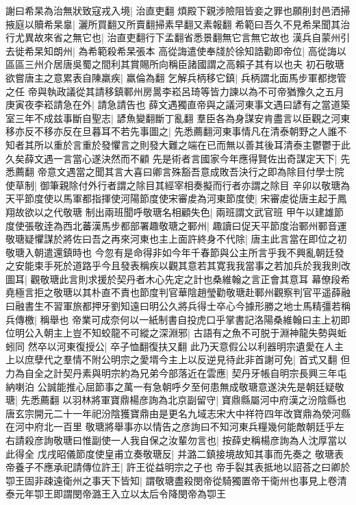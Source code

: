 謝曰希杲為治無狀致寇戎入境|{
	治直吏翻}
煩殿下親涉險阻皆妾之罪也願削封邑洒掃掖庭以贖希杲辠|{
	灑所買翻又所賣翻掃素早翻又素報翻}
希範曰吾久不見希杲聞其治行尤異故來省之無它也|{
	治直吏翻行下孟翻省悉景翻無它言無它故也}
漢兵自蒙州引去徙希杲知朗州|{
	為希範殺希杲張本}
高從誨遣使奉牋於徐知誥勸即帝位|{
	高從誨以區區三州介居唐吳蜀之間利其賞賜所向稱臣諸國謂之高賴子其有以也夫}
初石敬瑭欲嘗唐主之意累表自陳羸疾|{
	羸倫為翻}
乞解兵柄移它鎮|{
	兵柄謂北面馬步軍都揔管之任}
帝與執政議從其請移鎮鄆州房暠李崧呂琦等皆力諫以為不可帝猶豫久之五月庚寅夜李崧請急在外|{
	請急請告也}
薛文遇獨直帝與之議河東事文遇曰諺有之當道築室三年不成兹事斷自聖志|{
	諺魚變翻斷丁亂翻}
羣臣各為身謀安肯盡言以臣觀之河東移亦反不移亦反在旦暮耳不若先事圖之|{
	先悉薦翻河東事情凡在清泰朝野之人誰不知者其所以重於言重於發懼言之則發大難之端在已而無以善其後耳清泰主鬱鬱于此久矣薛文遇一言當心遂決然而不顧}
先是術者言國家今年應得賢佐出奇謀定天下|{
	先悉薦翻}
帝意文遇當之聞其言大喜曰卿言殊豁吾意成敗吾決行之即為除目付學士院使草制|{
	御筆親除付外行者謂之除目其經宰相奏擬而行者亦謂之除目}
辛卯以敬瑭為天平節度使以馬軍都指揮使河陽節度使宋審䖍為河東節度使|{
	宋審䖍從唐主起于鳳翔故欲以之代敬瑭}
制出兩班聞呼敬瑭名相顧失色|{
	兩班謂文武官班}
甲午以建雄節度使張敬逹為西北蕃漢馬步都部署趣敬瑭之鄆州|{
	趣讀曰促天平節度治鄆州鄆音運}
敬瑭疑懼謀於將佐曰吾之再來河東也主上面許終身不代除|{
	唐主此言當在即位之初敬瑭入朝遣還鎮時也}
今忽有是命得非如今年千春節與公主所言乎我不興亂朝廷發之安能束手死於道路乎今且發表稱疾以觀其意若其寛我我當事之若加兵於我我則改圖耳|{
	觀敬瑭此言則求援於契丹者木心先定之計也桑維翰之言正會其意耳}
幕僚段希堯極言拒之敬瑭以其朴直不責也節度判官華陰趙瑩勸敬瑭赴鄆州觀察判官平遥薛融曰融書生不習軍旅都押牙劉知遠曰明公久將兵得士卒心今據形勝之地士馬精彊若稱兵傳檄|{
	稱舉也}
帝業可成奈何以一紙制書自投虎口乎掌書記洛陽桑維翰曰主上初即位明公入朝主上豈不知蛟龍不可縱之深淵邪|{
	古語有之魚不可脱于淵神龍失勢與蚯蚓同}
然卒以河東復授公|{
	卒子恤翻復扶又翻}
此乃天意假公以利器明宗遺愛在人主上以庶孽代之羣情不附公明宗之愛壻今主上以反逆見待此非首謝可免|{
	首式又翻}
但力為自全之計契丹素與明宗約為兄弟今部落近在雲應|{
	契丹牙帳自明宗長興三年屯納喇泊}
公誠能推心屈節事之萬一有急朝呼夕至何患無成敬瑭意遂決先是朝廷疑敬瑭|{
	先悉薦翻}
以羽林將軍寶鼎楊彦詢為北京副留守|{
	寶鼎縣屬河中府漢之汾陰縣也唐玄宗開元二十一年祀汾陰獲寶鼎由是更名九域志宋大中祥符四年改寶鼎為滎河縣在河中府北一百里}
敬瑭將舉事亦以情告之彦詢曰不知河東兵糧幾何能敵朝廷乎左右請殺彦詢敬瑭曰惟副使一人我自保之汝輩勿言也|{
	按薛史稱楊彦詢為人沈厚當以此得全}
戊戌昭儀節度使皇甫立奏敬瑭反|{
	并潞二鎮接境故知其事而先奏之}
敬瑭表帝養子不應承祀請傳位許王|{
	許王從益明宗之子也}
帝手裂其表抵地以詔荅之曰卿於卾王固非疎遠衛州之事天下皆知|{
	謂敬瑭盡殺閔帝從騎獨置帝干衛州也事見上卷清泰元年卾王即謂閔帝潞王入立以太后令降閔帝為卾王}
